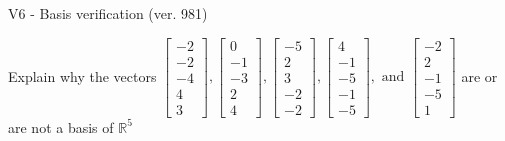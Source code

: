 \begin{exercise}
  \begin{exerciseTitle}V6 - Basis verification (ver. 981)\end{exerciseTitle}
  \begin{exerciseStatement}
    Explain why the vectors \(\left[\begin{array}{r}
-2 \\
-2 \\
-4 \\
4 \\
3
\end{array}\right] , \left[\begin{array}{r}
0 \\
-1 \\
-3 \\
2 \\
4
\end{array}\right] , \left[\begin{array}{r}
-5 \\
2 \\
3 \\
-2 \\
-2
\end{array}\right] , \left[\begin{array}{r}
4 \\
-1 \\
-5 \\
-1 \\
-5
\end{array}\right] , \text{ and } \left[\begin{array}{r}
-2 \\
2 \\
-1 \\
-5 \\
1
\end{array}\right]\) are or are not a basis of \(\mathbb{R}^5\)	



\end{exerciseStatement}
\end{exercise}
